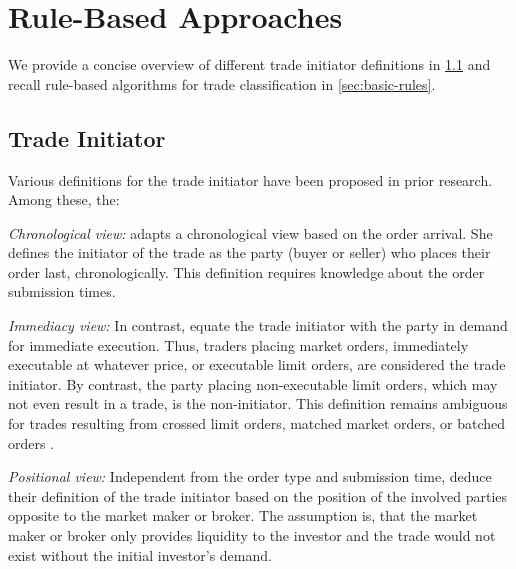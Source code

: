 \section{Rule-Based Approaches}\label{sec:rule-based-approaches}

We provide a concise overview of different trade initiator definitions in \cref{sec:trade-initiator} and recall rule-based algorithms for trade classification in \cref{sec:basic-rules}.

\subsection{Trade Initiator}
\label{sec:trade-initiator}

Various definitions for the trade initiator have been proposed in prior
research. Among these, the:

\emph{Chronological view:} \textcite[][267]{odders-whiteOccurrenceConsequencesInaccurate2000} adapts a chronological view based on the order arrival. She defines the initiator of the trade as the party (buyer or seller) who places their order last, chronologically. This definition requires knowledge about the order submission times.

\emph{Immediacy view:} In contrast, \textcite[][94--97]{leeInferringInvestorBehavior2000} equate the trade initiator with the party in demand for immediate execution. Thus, traders placing market orders, immediately executable at whatever price, or executable limit orders, are considered the trade initiator. By contrast, the party placing non-executable limit orders, which may not even result in a trade, is the non-initiator. This definition remains ambiguous for trades resulting from crossed limit orders, matched market orders, or batched orders \autocite[][94--95]{leeInferringInvestorBehavior2000}.

\emph{Positional view:} Independent from the order type and submission time, \textcite[][533]{ellisAccuracyTradeClassification2000} deduce their definition of the trade initiator based on the position of the involved parties opposite to the market maker or broker. The assumption is, that the market maker or broker only provides liquidity to the investor and the trade would not exist without the initial investor's demand.


